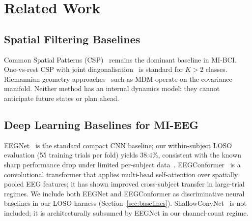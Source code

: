 \documentclass[journal]{IEEEtran}
\begin{document}
\section{Related Work}
\label{sec:related}

\subsection{Spatial Filtering Baselines}
Common Spatial Patterns (CSP)~\cite{koles1991quantification} remains the dominant baseline in MI-BCI.
One-vs-rest CSP with joint diagonalisation~\cite{grosse2008robust} is standard for $K>2$ classes.
Riemannian geometry approaches~\cite{barachant2012multiclass} such as MDM operate on the covariance manifold.
Neither method has an internal dynamics model: they cannot anticipate future states or plan ahead.

\subsection{Deep Learning Baselines for MI-EEG}
EEGNet~\cite{lawhern2018eegnet} is the standard compact CNN baseline; our within-subject LOSO evaluation (55 training trials per fold) yields $38.4\%$, consistent with the known sharp performance drop under limited per-subject data~\cite{kostas2022bendr}.
EEGConformer~\cite{song2022eegconformer} is a convolutional transformer that applies multi-head self-attention over spatially pooled EEG features; it has shown improved cross-subject transfer in large-trial regimes.
We include both EEGNet and EEGConformer as discriminative neural baselines in our LOSO harness (Section~\ref{sec:baselines}).
ShallowConvNet~\cite{schirrmeister2017deep} is not included; it is architecturally subsumed by EEGNet in our channel-count regime.
\end{document}
